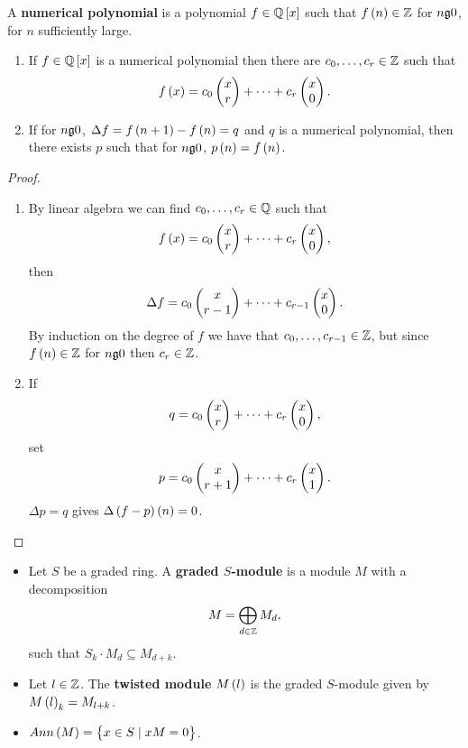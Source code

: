 \begin{definition}
A \textbf{numerical polynomial} is a polynomial $ f \in \Q\sbr{x} $ such that $ f\br{n} \in \Z $ for $ n \g 0 $, for $ n $ sufficiently large.
\end{definition}

\begin{theorem}
\hfill
\begin{enumerate}
\item If $ f \in \Q\sbr{x} $ is a numerical polynomial then there are $ c_0, \dots, c_r \in \mathbb{Z} $ such that
$$ f\br{x} = c_0\twobyone{x}{r} + \dots + c_r\twobyone{x}{0}. $$
\item If for $ n \g 0 $, $ \Delta f = f\br{n + 1} - f\br{n} = q $ and $ q $ is a numerical polynomial, then there exists $ p $ such that for $ n \g 0 $, $ p\br{n} = f\br{n} $.
\end{enumerate}
\end{theorem}

\begin{proof}
\hfill
\begin{enumerate}
\item By linear algebra we can find $ c_0, \dots, c_r \in \mathbb{Q} $ such that
$$ f\br{x} = c_0\twobyone{x}{r} + \dots + c_r\twobyone{x}{0}, $$
then
$$ \Delta f = c_0\begin{pmatrix} x \\ r - 1 \end{pmatrix} + \dots + c_{r - 1}\begin{pmatrix} x \\ 0 \end{pmatrix}. $$
By induction on the degree of $ f $ we have that $ c_0, \dots, c_{r - 1} \in \mathbb{Z} $, but since $ f\br{n} \in \Z $ for $ n \g 0 $ then $ c_r \in \mathbb{Z} $.
\item If
$$ q = c_0\begin{pmatrix} x \\ r \end{pmatrix} + \dots + c_r\begin{pmatrix} x \\ 0 \end{pmatrix}, $$
set
$$ p = c_0\begin{pmatrix} x \\ r + 1 \end{pmatrix} + \dots + c_r\begin{pmatrix} x \\ 1 \end{pmatrix}. $$
$ \Delta p = q $ gives $ \Delta \br{f - p}\br{n} = 0 $.
\end{enumerate}
\end{proof}

\pagebreak

\begin{definition}
\hfill
\begin{itemize}
\item Let $ S $ be a graded ring. A \textbf{graded $ S $-module} is a module $ M $ with a decomposition
$$ M = \bigoplus_{d \in \mathbb{Z}} M_d, $$
such that $ S_k \cdot M_d \subseteq M_{d + k} $.
\item Let $ l \in \mathbb{Z} $. The \textbf{twisted module} $ M\br{l} $ is the graded $ S $-module given by $ M\br{l}_k = M_{l + k} $.
\item $ Ann\br{M} = \cbr{x \in S \mid xM = 0} $.
\end{itemize}
\end{definition}

